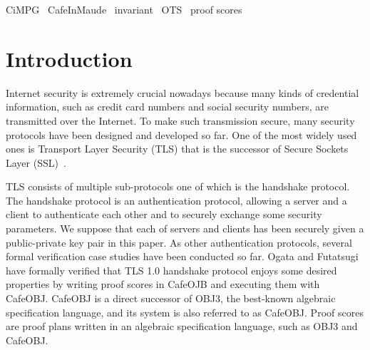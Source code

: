 \documentclass[a4paper,fleqn]{cas-dc}
\begin{document}


\begin{keywords}
 CiMPG \ CafeInMaude \ invariant \ OTS \ proof scores
\end{keywords}

\section{Introduction}\label{intro}
Internet security is extremely crucial nowadays because many kinds of credential information, such as credit card numbers and social security numbers, are transmitted over the Internet. To make such transmission secure, many security protocols have been designed and developed so far. One of the most widely used ones is Transport Layer Security (TLS) \cite{dierk} that is the successor of Secure Sockets Layer (SSL)~\cite{*1}. 

TLS consists of multiple sub-protocols one of which is the handshake protocol. The handshake protocol is an authentication protocol, allowing a server and a client to authenticate each other and to securely exchange some security parameters. We suppose that each of servers and clients has been securely given a public-private key pair in this paper. As other authentication protocols, several formal verification case studies \cite{article, 10.1145/3133956.3134063, 10.1145/967900.968063} have been conducted so far. Ogata and Futatsugi \cite{ogata05} have formally verified that TLS 1.0 handshake protocol enjoys some desired properties by writing proof scores \cite{OgataF03fmoods} in CafeOJB \cite{DiaconescuF98amast} and executing them with CafeOBJ. 
CafeOBJ is a direct successor of OBJ3, the best-known algebraic specification language, and its system is also referred to as CafeOBJ. Proof scores are proof plans written in an algebraic specification language, such as OBJ3 and CafeOBJ.
\end{document}
